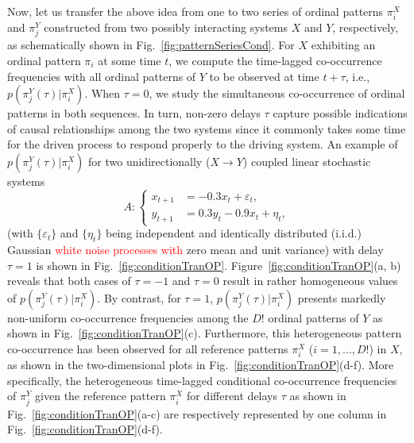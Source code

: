 \documentclass[12pt,aip,cha,reprint,nofootinbib]{revtex4-1}
\begin{document}
Now, let us transfer the above idea from one to two series of ordinal patterns $\pi_i^{X}$ and $\pi_j^{Y}$ constructed from two possibly interacting systems $X$ and $Y$, respectively, as schematically shown in Fig.~\ref{fig:patternSeriesCond}. For $X$ exhibiting an ordinal pattern $\pi_i$ at some time $t$, we compute the time-lagged co-occurrence frequencies with all ordinal patterns of $Y$ to be observed at time $t+\tau$, i.e., $p(\pi_{j}^{Y}(\tau) | \pi_i^{X})$. When $\tau = 0$, we study the simultaneous co-occurrence of ordinal patterns in both sequences. In turn, non-zero delays $\tau$ capture possible indications of causal relationships among the two systems since it commonly takes some time for the driven process to respond properly to the driving system. An example of $p(\pi_{j}^{Y}(\tau) | \pi_i^{X})$ for two unidirectionally ($X \to Y$) coupled linear stochastic systems \cite{LiPRE2018}
\begin{equation} \label{eq:B}
A: \left \{ \begin{aligned}
x_{t+1} &= -0.3 x_{t} + \varepsilon_t, \\
y_{t+1} &= 0.3 y_{t} - 0.9 x_{t} + \eta_t,
\end{aligned}
\right.
\end{equation}
(with $\{ \varepsilon_t \}$ and $\{ \eta_t \}$ being independent and identically distributed (i.i.d.) Gaussian \textcolor{red}{white noise processes with} zero mean and unit variance) with delay $\tau = 1$ is shown in Fig.~\ref{fig:conditionTranOP}. Figure~\ref{fig:conditionTranOP}(a, b) reveals that both cases of $\tau = -1$ and $\tau = 0$ result in rather homogeneous values of $p(\pi_{j}^{Y}(\tau) | \pi_i^{X})$. By contrast, for $\tau=1$, $p(\pi_{j}^{Y}(\tau) | \pi_i^{X})$ presents markedly non-uniform co-occurrence frequencies among the $D!$ ordinal patterns of $Y$ as shown in Fig.~\ref{fig:conditionTranOP}(c). Furthermore, this heterogeneous pattern co-occurrence has been observed for all reference patterns $\pi_i^{X}$ ($i = 1, \dots, D!$) in $X$, as shown in the two-dimensional plots in Fig.~\ref{fig:conditionTranOP}(d-f). More specifically, the heterogeneous time-lagged conditional co-occurrence frequencies of $\pi_j^{Y}$ given the reference pattern $\pi_i^{X}$ for different delays $\tau$ as shown in Fig.~\ref{fig:conditionTranOP}(a-c) are respectively represented by one column in Fig.~\ref{fig:conditionTranOP}(d-f). 
\end{document}
